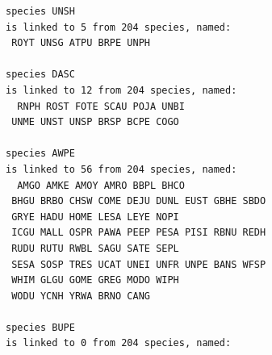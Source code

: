 \documentclass{statsoc}
\begin{document}
\begin{lstlisting}
species UNSH
is linked to 5 from 204 species, named:
 ROYT UNSG ATPU BRPE UNPH

species DASC
is linked to 12 from 204 species, named:
  RNPH ROST FOTE SCAU POJA UNBI
 UNME UNST UNSP BRSP BCPE COGO

species AWPE
is linked to 56 from 204 species, named:
  AMGO AMKE AMOY AMRO BBPL BHCO
 BHGU BRBO CHSW COME DEJU DUNL EUST GBHE SBDO
 GRYE HADU HOME LESA LEYE NOPI
 ICGU MALL OSPR PAWA PEEP PESA PISI RBNU REDH
 RUDU RUTU RWBL SAGU SATE SEPL
 SESA SOSP TRES UCAT UNEI UNFR UNPE BANS WFSP
 WHIM GLGU GOME GREG MODO WIPH
 WODU YCNH YRWA BRNO CANG

species BUPE
is linked to 0 from 204 species, named:
\end{lstlisting}





\end{document}
